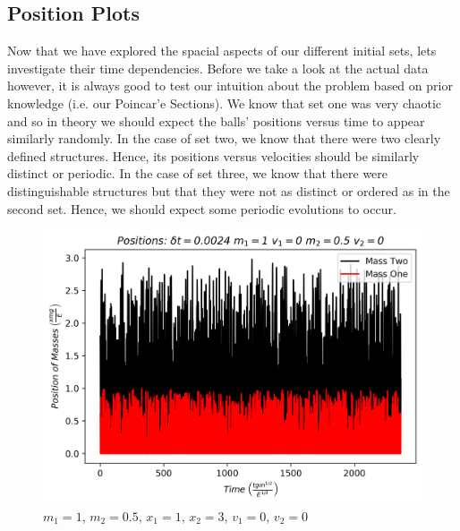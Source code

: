 \documentclass[twocolumn]{article}
\begin{document}
\subsection{Position Plots}
\hspace{\parindent} Now that we have explored the spacial aspects of our different initial sets, lets investigate their time dependencies. Before we take a look at the actual data however, it is always good to test our intuition about the problem based on prior knowledge (i.e. our Poincar'e Sections). We know that set one was very chaotic and so in theory we should expect the balls' positions versus time to appear similarly randomly. In the case of set two, we know that there were two clearly defined structures. Hence, its positions versus velocities should be similarly distinct or periodic. In the case of set three, we know that there were distinguishable structures but that they were not as distinct or ordered as in the second set. Hence, we should expect some periodic evolutions to  occur. \\
\begin{figure}[H]
\caption{$m_1=1$, $m_2=0.5$, $x_1=1$, $x_2=3$, $v_1=0$, $v_2=0$}
\centering
\includegraphics[scale=.45]{Positions-MassOne1MassTwo0-5x1i1x2i3}
\end{figure}
\end{document}
